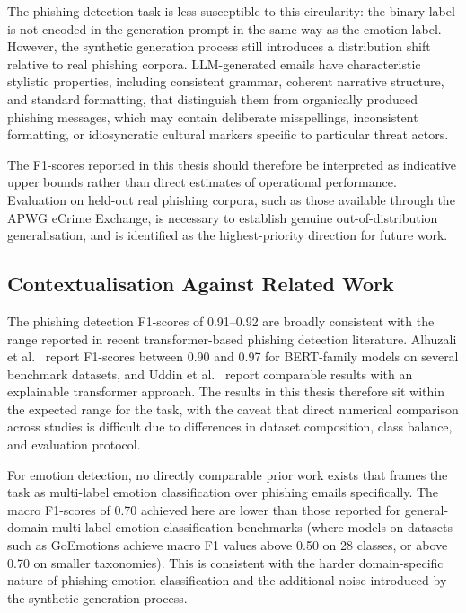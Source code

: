 The phishing detection task is less susceptible to this circularity: the binary label is not encoded in the generation prompt in the same way as the emotion label. However, the synthetic generation process still introduces a distribution shift relative to real phishing corpora. LLM-generated emails have characteristic stylistic properties, including consistent grammar, coherent narrative structure, and standard formatting, that distinguish them from organically produced phishing messages, which may contain deliberate misspellings, inconsistent formatting, or idiosyncratic cultural markers specific to particular threat actors.

The F1-scores reported in this thesis should therefore be interpreted as indicative upper bounds rather than direct estimates of operational performance. Evaluation on held-out real phishing corpora, such as those available through the \ac{APWG} eCrime Exchange, is necessary to establish genuine out-of-distribution generalisation, and is identified as the highest-priority direction for future work.

\subsection{Contextualisation Against Related Work}

The phishing detection F1-scores of 0.91--0.92 are broadly consistent with the range reported in recent transformer-based phishing detection literature. Alhuzali et al.~\cite{app15063396} report F1-scores between 0.90 and 0.97 for BERT-family models on several benchmark datasets, and Uddin et al.~\cite{uddin2025} report comparable results with an explainable transformer approach. The results in this thesis therefore sit within the expected range for the task, with the caveat that direct numerical comparison across studies is difficult due to differences in dataset composition, class balance, and evaluation protocol.

For emotion detection, no directly comparable prior work exists that frames the task as multi-label emotion classification over phishing emails specifically. The macro F1-scores of 0.70 achieved here are lower than those reported for general-domain multi-label emotion classification benchmarks (where models on datasets such as GoEmotions achieve macro F1 values above 0.50 on 28 classes, or above 0.70 on smaller taxonomies). This is consistent with the harder domain-specific nature of phishing emotion classification and the additional noise introduced by the synthetic generation process.

